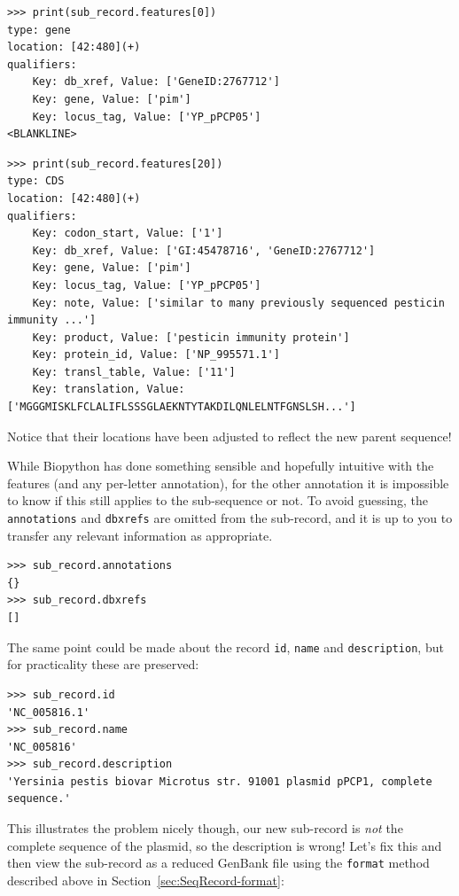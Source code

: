 \documentclass{report}
\begin{document}
\begin{verbatim}
>>> print(sub_record.features[0])
type: gene
location: [42:480](+)
qualifiers: 
    Key: db_xref, Value: ['GeneID:2767712']
    Key: gene, Value: ['pim']
    Key: locus_tag, Value: ['YP_pPCP05']
<BLANKLINE>
\end{verbatim}
\begin{verbatim}
>>> print(sub_record.features[20])
type: CDS
location: [42:480](+)
qualifiers: 
    Key: codon_start, Value: ['1']
    Key: db_xref, Value: ['GI:45478716', 'GeneID:2767712']
    Key: gene, Value: ['pim']
    Key: locus_tag, Value: ['YP_pPCP05']
    Key: note, Value: ['similar to many previously sequenced pesticin immunity ...']
    Key: product, Value: ['pesticin immunity protein']
    Key: protein_id, Value: ['NP_995571.1']
    Key: transl_table, Value: ['11']
    Key: translation, Value: ['MGGGMISKLFCLALIFLSSSGLAEKNTYTAKDILQNLELNTFGNSLSH...']
\end{verbatim}

\noindent Notice that their locations have been adjusted to reflect the new parent sequence!

While Biopython has done something sensible and hopefully intuitive with the features
(and any per-letter annotation), for the other annotation it is impossible to know if
this still applies to the sub-sequence or not. To avoid guessing, the \texttt{annotations}
and \texttt{dbxrefs} are omitted from the sub-record, and it is up to you to transfer
any relevant information as appropriate.

\begin{verbatim}
>>> sub_record.annotations
{}
>>> sub_record.dbxrefs
[]
\end{verbatim}

The same point could be made about the record \texttt{id}, \texttt{name}
and \texttt{description}, but for practicality these are preserved:

\begin{verbatim}
>>> sub_record.id
'NC_005816.1'
>>> sub_record.name
'NC_005816'
>>> sub_record.description
'Yersinia pestis biovar Microtus str. 91001 plasmid pPCP1, complete sequence.'
\end{verbatim}

\noindent This illustrates the problem nicely though, our new sub-record is
\emph{not} the complete sequence of the plasmid, so the description is wrong!
Let's fix this and then view the sub-record as a reduced GenBank file using
the \texttt{format} method described above in Section~\ref{sec:SeqRecord-format}:
\end{document}
